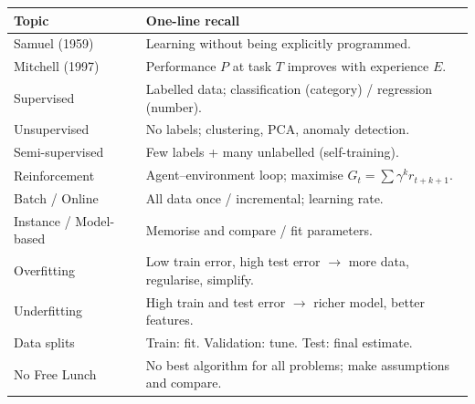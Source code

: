 \begin{revision}
\begin{center}\small
\begin{tabular}{@{}p{3.6cm}p{9.6cm}@{}}
\toprule
\textbf{Topic} & \textbf{One-line recall}\\
\midrule
Samuel (1959) & Learning without being explicitly programmed.\\
Mitchell (1997) & Performance $P$ at task $T$ improves with experience $E$.\\
Supervised & Labelled data; classification (category) / regression (number).\\
Unsupervised & No labels; clustering, PCA, anomaly detection.\\
Semi-supervised & Few labels + many unlabelled (self-training).\\
Reinforcement & Agent--environment loop; maximise $G_t=\sum\gamma^k r_{t+k+1}$.\\
Batch / Online & All data once / incremental; learning rate.\\
Instance / Model-based & Memorise and compare / fit parameters.\\
Overfitting & Low train error, high test error $\to$ more data, regularise, simplify.\\
Underfitting & High train and test error $\to$ richer model, better features.\\
Data splits & Train: fit. Validation: tune. Test: final estimate.\\
No Free Lunch & No best algorithm for all problems; make assumptions and compare.\\
\bottomrule
\end{tabular}
\end{center}
\end{revision}
